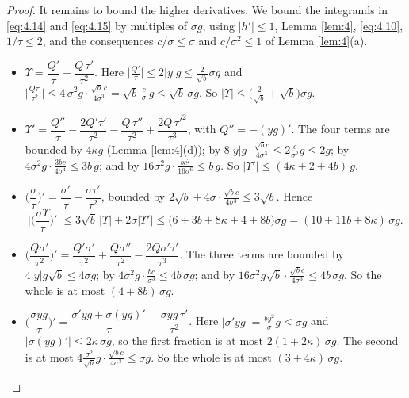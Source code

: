 \documentclass[aip,jmp,preprint,onecolumn,floatfix,superscriptaddress,nofootinbib,11pt]{revtex4-2}
\theoremstyle{plain}
\theoremstyle{remark}
\numberwithin{equation}{section}
\begin{document}
\begin{proof}
It remains to bound the higher derivatives. We bound the integrands in \eqref{eq:4.14} and \eqref{eq:4.15} by multiples of $\sigma g$, using $|h'|\le1$, Lemma \ref{lem:4}, \eqref{eq:4.10}, $1/\tau\le2$, and the consequences $c/\sigma\le\sigma$ and $c/\sigma^{2}\le1$ of Lemma \ref{lem:4}(a).
%
\begin{itemize}
\item $\Upsilon=\dfrac{Q'}{\tau}-\dfrac{Q\,\tau'}{\tau^{2}}$. Here $\big|\tfrac{Q'}{\tau}\big|\le2|y|g\le\tfrac{2}{\sqrt b}\sigma g$ and $\big|\tfrac{Q\tau'}{\tau^{2}}\big|\le4\,\sigma^{2}g\cdot\tfrac{\sqrt b\,c}{4\sigma^{3}}=\sqrt b\,\tfrac c\sigma\,g\le\sqrt b\,\sigma g$. So $|\Upsilon|\le\big(\tfrac{2}{\sqrt b}+\sqrt b\big)\sigma g$.
\item $\Upsilon'=\dfrac{Q''}{\tau}-\dfrac{2Q'\tau'}{\tau^{2}}-\dfrac{Q\,\tau''}{\tau^{2}}+\dfrac{2Q\,\tau'^{2}}{\tau^{3}}$, with $Q''=-(yg)'$. The four terms are bounded by $4\kappa g$ (Lemma \ref{lem:4}(d)); by $8|y|g\cdot\tfrac{\sqrt bc}{4\sigma^{3}}\le2\tfrac{c}{\sigma^{2}}g\le2g$; by $4\sigma^{2}g\cdot\tfrac{3bc}{4\sigma^{4}}\le3b\,g$; and by $16\sigma^{2}g\cdot\tfrac{bc^{2}}{16\sigma^{6}}\le b\,g$. So $|\Upsilon'|\le(4\kappa+2+4b)\,g$.
\item $\Big(\dfrac\sigma\tau\Big)'=\dfrac{\sigma'}{\tau}-\dfrac{\sigma\tau'}{\tau^{2}}$, bounded by $2\sqrt b+4\sigma\cdot\tfrac{\sqrt bc}{4\sigma^{3}}\le3\sqrt b$. Hence
\begin{equation*}
\Big|\Big(\frac{\sigma \Upsilon}{\tau}\Big)'\Big|\le3\sqrt b\,|\Upsilon|+2\sigma|\Upsilon'|\le\big(6+3b+8\kappa+4+8b\big)\sigma g=(10+11b+8\kappa)\,\sigma g .
\end{equation*}
 
\item $\Big(\dfrac{Q\sigma'}{\tau^{2}}\Big)'=\dfrac{Q'\sigma'}{\tau^{2}}+\dfrac{Q\sigma''}{\tau^{2}}-\dfrac{2Q\sigma'\tau'}{\tau^{3}}$. The three terms are bounded by $4|y|g\sqrt b\le4\sigma g$; by $4\sigma^{2}g\cdot\tfrac{bc}{\sigma^{3}}\le4b\,\sigma g$; and by $16\sigma^{2}g\sqrt b\cdot\tfrac{\sqrt bc}{4\sigma^{3}}\le4b\,\sigma g$. So the whole is at most $(4+8b)\,\sigma g$.
\item $\Big(\dfrac{\sigma yg}{\tau}\Big)'=\dfrac{\sigma'yg+\sigma(yg)'}{\tau}-\dfrac{\sigma yg\,\tau'}{\tau^{2}}$. Here $|\sigma'yg|=\tfrac{by^{2}}{\sigma}g\le\sigma g$ and $|\sigma(yg)'|\le2\kappa\,\sigma g$, so the first fraction is at most $2(1+2\kappa)\,\sigma g$. The second is at most $4\tfrac{\sigma^{2}}{\sqrt b}g\cdot\tfrac{\sqrt bc}{4\sigma^{3}}\le\sigma g$. So the whole is at most $(3+4\kappa)\,\sigma g$.
\end{itemize}
 

\end{proof}
\end{document}
